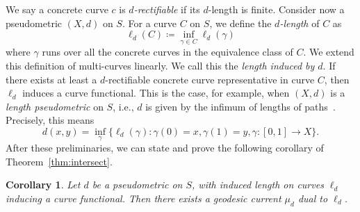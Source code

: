 \documentclass[11pt]{amsart}
\numberwithin{equation}{section}
\numberwithin{figure}{section}
\newtheorem{corollary}[theorem]{Corollary}
\theoremstyle{definition}
\theoremstyle{plain}
\begin{document}
We say
a concrete curve $c$ is \emph{$d$-rectifiable} if its $d$-length is finite.
Consider now a pseudometric $(X,d)$ on $S$.
For a curve $C$ on $S$, we define the \emph{$d$-length} of $C$ as
\[
\ell_d(C) \coloneqq \inf_{\gamma \in C} \ell_d(\gamma)
\]
where $\gamma$ runs over all the concrete curves in the equivalence class of $C$.
We extend this definition of multi-curves linearly.
We call this the \emph{length induced by $d$}.
If there exists at least a $d$-rectifiable concrete curve representative in curve $C$, then $\ell_d$ induces a curve functional. This is the case, for example, when  $(X,d)$ is a \emph{length pseudometric} on $S$, i.e., 
$d$ is given by the infimum of lengths of paths~\cite[Chapter~I.2, Definition~3.1]{BH11:NonPosCurvature}. Precisely, this means
\[
d(x,y) = \inf_{\gamma} \{ \ell_d(\gamma) : \gamma(0)=x, \gamma(1)=y, \gamma : [0,1] \to X \}.
\]
After these preliminaries, we can state and prove the following corollary of Theorem~\ref{thm:intersect}.
\begin{corollary}
    Let $d$ be a pseudometric on $S$, with induced length on curves $\ell_d$ inducing a curve functional. Then there exists a geodesic current $\mu_d$ dual to $\ell_d$.
    \label{cor:length_dual}
\end{corollary}
\end{document}
